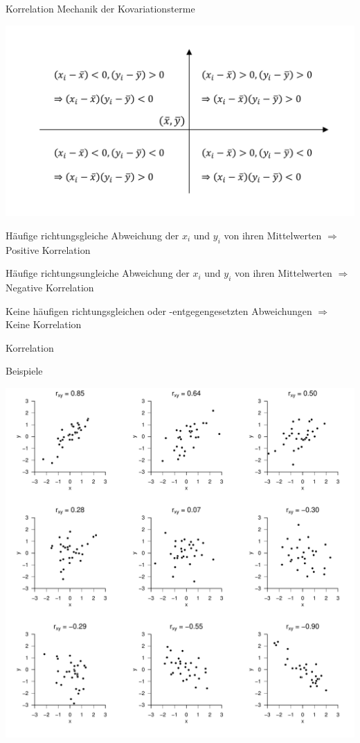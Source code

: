 \documentclass[
  8pt,
  ignorenonframetext,
]{beamer}
\begin{document}
\begin{frame}{Korrelation}
\protect\hypertarget{korrelation-5}{}
Mechanik der Kovariationsterme

\begin{center}\includegraphics[width=0.8\linewidth]{7_Abbildungen/mvda_7_korrelationsterme} \end{center}

\center
\footnotesize

Häufige richtungsgleiche Abweichung der \(x_i\) und \(y_i\) von ihren
Mittelwerten \(\Rightarrow\) Positive Korrelation

Häufige richtungsungleiche Abweichung der \(x_i\) und \(y_i\) von ihren
Mittelwerten \(\Rightarrow\) Negative Korrelation

Keine häufigen richtungsgleichen oder -entgegengesetzten Abweichungen
\(\Rightarrow\) Keine Korrelation
\end{frame}

\begin{frame}{Korrelation}
\protect\hypertarget{korrelation-6}{}
\vspace{2mm}

Beispiele

\begin{center}\includegraphics[width=0.6\linewidth]{7_Abbildungen/mvda_7_korrelationsbeispiele} \end{center}
\end{frame}
\end{document}
